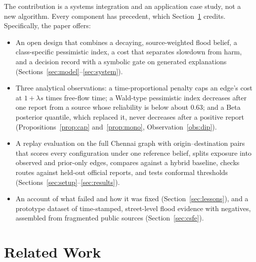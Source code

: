 \documentclass[conference]{IEEEtran}
\begin{document}
The contribution is a systems integration and an application case study, not a new algorithm. Every component has precedent, which Section~\ref{sec:related} credits. Specifically, the paper offers:
\begin{itemize}
\item An open design that combines a decaying, source-weighted flood belief, a class-specific pessimistic index, a cost that separates slowdown from harm, and a decision record with a symbolic gate on generated explanations (Sections~\ref{sec:model}--\ref{sec:system}).
\item Three analytical observations: a time-proportional penalty caps an edge's cost at $1+\lambda s$ times free-flow time; a Wald-type pessimistic index decreases after one report from a source whose reliability is below about 0.63; and a Beta posterior quantile, which replaced it, never decreases after a positive report (Propositions~\ref{prop:cap} and~\ref{prop:mono}, Observation~\ref{obs:dip}).
\item A replay evaluation on the full Chennai graph with \NOD{} origin--destination pairs that scores every configuration under one reference belief, splits exposure into observed and prior-only edges, compares against a hybrid baseline, checks routes against held-out official reports, and tests conformal thresholds (Sections~\ref{sec:setup}--\ref{sec:results}).
\item An account of what failed and how it was fixed (Section~\ref{sec:lessons}), and a prototype dataset of time-stamped, street-level flood evidence with negatives, assembled from fragmented public sources (Section~\ref{sec:csfe}).
\end{itemize}

\section{Related Work}\label{sec:related}
\end{document}
